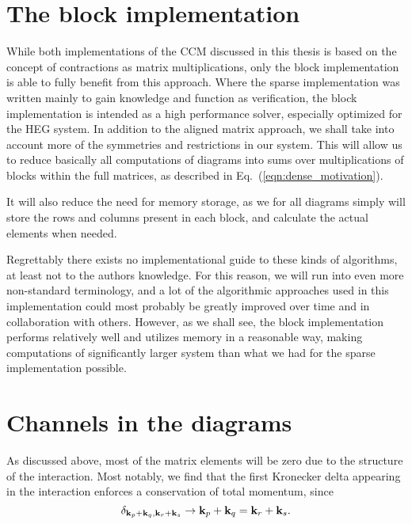 \section{The block implementation}

While both implementations of the CCM discussed in this thesis is based on the concept of contractions as matrix multiplications, only the block implementation is able to fully benefit from this approach. Where the sparse implementation was written mainly to gain knowledge and function as verification, the block implementation is intended as a high performance solver, especially optimized for the HEG system. In addition to the aligned matrix approach, we shall take into account more of the symmetries and restrictions in our system. This will allow us to reduce basically all computations of diagrams into sums over multiplications of blocks within the full matrices, as described in Eq.~(\ref{eqn:dense_motivation}). 

It will also reduce the need for memory storage, as we for all diagrams simply will store the rows and columns present in each block, and calculate the actual elements when needed. 

Regrettably there exists no implementational guide to these kinds of
algorithms, at least not to the authors knowledge. For this reason, we
will run into even more non-standard terminology, and a lot of the
algorithmic approaches used in this implementation could most probably
be greatly improved over time and in collaboration with
others. However, as we shall see, the block implementation performs
relatively well and utilizes memory in a reasonable way, making
computations of significantly larger system than what we had for the
sparse implementation possible.

\section{Channels in the diagrams}

As discussed above, most of the matrix elements will be zero due
to the structure of the interaction.  Most notably, we find that the
first Kronecker delta appearing in the interaction enforces a
conservation of total momentum, since
\begin{equation}
\delta_{\bold{k}_p + \bold{k}_q, \bold{k}_r + \bold{k}_s} \rightarrow \bold{k}_p + \bold{k}_q = \bold{k}_r + \bold{k}_s .
\label{eqn:momentumconservation}
\end{equation}

